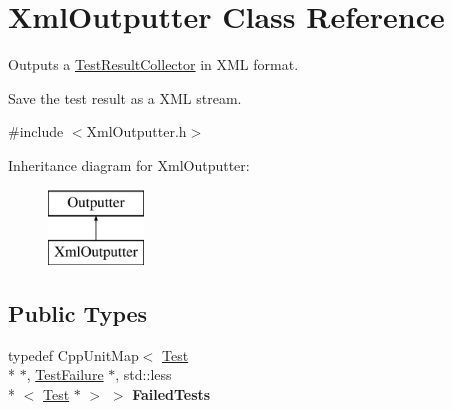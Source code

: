 \hypertarget{class_xml_outputter}{\section{Xml\-Outputter Class Reference}
\label{class_xml_outputter}
}


Outputs a \hyperlink{class_test_result_collector}{Test\-Result\-Collector} in X\-M\-L format.

Save the test result as a X\-M\-L stream.  




{\ttfamily \#include $<$Xml\-Outputter.\-h$>$}

Inheritance diagram for Xml\-Outputter\-:\begin{figure}[H]
\begin{center}
\leavevmode
\includegraphics[height=2.000000cm]{class_xml_outputter}
\end{center}
\end{figure}
\subsection*{Public Types}
\begin{DoxyCompactItemize}
\item 
\hypertarget{class_xml_outputter_a987608d04ba56dcc13461c9522f3da7e}{typedef Cpp\-Unit\-Map$<$ \hyperlink{class_test}{Test} \\*
$\ast$, \hyperlink{class_test_failure}{Test\-Failure} $\ast$, std\-::less\\*
$<$ \hyperlink{class_test}{Test} $\ast$ $>$ $>$ {\bfseries Failed\-Tests}}\label{class_xml_outputter_a987608d04ba56dcc13461c9522f3da7e}

\end{DoxyCompactItemize}
